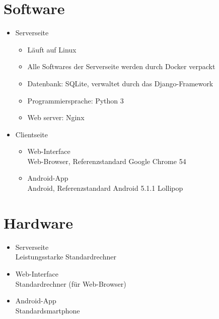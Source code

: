 \documentclass[a4paper]{scrreprt}
\begin{document}
        \section{Software}
            \begin{itemize}
                \item Serverseite
                    \begin{itemize}
                        \item  Läuft auf Linux
                        \item Alle Softwares der Serverseite werden durch Docker verpackt
                        \item Datenbank: SQLite, verwaltet durch das Django-Framework
                        \item Programmiersprache: Python 3
                        \item Web server: Nginx
                    \end{itemize}
                \item Clientseite
                    \begin{itemize}
                        \item \gls{Web-Interface}\\
                             Web-Browser, Referenzstandard Google Chrome 54
                        \item  \gls{Android-App}\\
                             Android, Referenzstandard Android 5.1.1 Lollipop
                    \end{itemize}
            \end{itemize}

        \section{Hardware}
            \begin{itemize}
                \item Serverseite\\
                    Leistungsstarke Standardrechner
                \item  \gls{Web-Interface}\\
                    Standardrechner (für Web-Browser)
                \item \gls{Android-App}\\
                    Standardsmartphone
            \end{itemize}
\end{document}
